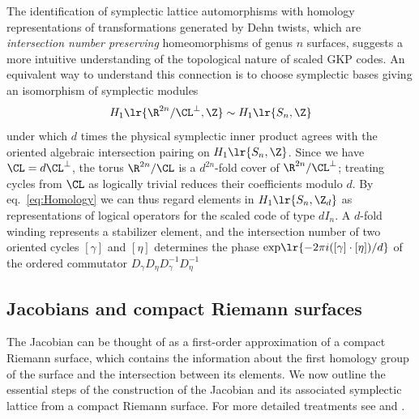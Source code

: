 \documentclass[a4paper, aps, pra, 11pt, onecolumn, tightenlines, superscriptaddress]{revtex4-2}
\begin{document}
The identification of symplectic lattice automorphisms with homology representations of transformations generated by Dehn twists, which are \textit{intersection number preserving} homeomorphisms of genus $n$ surfaces, suggests a more intuitive understanding of the topological nature of scaled GKP codes. 
An equivalent way to understand this connection is to choose symplectic bases giving an isomorphism of symplectic modules
\begin{equation}
    H_1\lr{\R^{2n}/\CL^{\perp}, \Z} \sim H_1\lr{S_n, \Z} \label{eq:Homology}
\end{equation}
under which $d$ times the physical symplectic inner product agrees with the oriented algebraic intersection pairing on $H_1\lr{S_n,\Z}$. 
Since we have $\CL=d\CL^{\perp}$, the torus $\R^{2n}/\CL$ is a $d^{2n}$-fold cover of $\R^{2n}/\CL^{\perp}$; treating cycles from $\CL$ as logically trivial reduces their coefficients modulo $d$. 
By eq.~\eqref{eq:Homology} we can thus regard elements in $H_1\lr{S_n, \Z_d} $ as representations of logical operators for the scaled code of type $dI_n$. 
A $d$-fold winding represents a stabilizer element, and the intersection number of two oriented cycles $[\gamma]$ and $[\eta]$ determines the phase $\exp\!\lr{-2\pi i([\gamma]\cdot[\eta])/d}$ of the ordered commutator $D_\gamma D_\eta D_\gamma^{-1}D_\eta^{-1}$


\subsection{Jacobians and compact Riemann surfaces}
The Jacobian can be thought of as a first-order approximation of a compact Riemann surface, which contains the information about the first homology group of the surface and the intersection between its elements.
We now outline the essential steps of the construction of the Jacobian and its associated symplectic lattice from a compact Riemann surface. For more detailed treatments see \cite[Ch.~11]{Birkenhake_2004} and \cite{Sarnak1994, Berge}.
\end{document}
